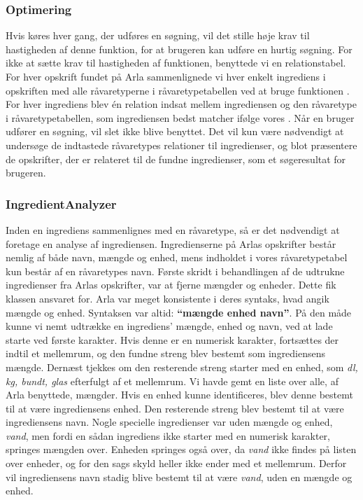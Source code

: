\subsubsection{Optimering}
Hvis  køres hver gang, der udføres en søgning, vil det stille høje krav til hastigheden af denne funktion, for at brugeren kan udføre en hurtig søgning. For ikke at sætte krav til hastigheden af funktionen, benyttede vi en relationstabel. For hver opskrift fundet på Arla sammenlignede vi hver enkelt ingrediens i opskriften med alle råvaretyperne i råvaretypetabellen ved at bruge funktionen . For hver ingrediens blev én relation indsat mellem ingrediensen og den råvaretype i råvaretypetabellen, som ingrediensen bedst matcher ifølge vores . Når en bruger udfører en søgning, vil  slet ikke blive benyttet. Det vil kun være nødvendigt at undersøge de indtastede råvaretypes relationer til ingredienser, og blot præsentere de opskrifter, der er relateret til de fundne ingredienser, som et søgeresultat for brugeren.

\subsubsection{IngredientAnalyzer}
Inden en ingrediens sammenlignes med en råvaretype, så er det nødvendigt at foretage en analyse af ingrediensen. Ingredienserne på Arlas opskrifter består nemlig af både navn, mængde og enhed, mens indholdet i vores råvaretypetabel kun består af en råvaretypes navn. Første skridt i behandlingen af de udtrukne ingredienser fra Arlas opskrifter, var at fjerne mængder og enheder. Dette fik klassen  ansvaret for. Arla var meget konsistente i deres syntaks, hvad angik mængde og enhed. Syntaksen var altid: \textbf{``mængde enhed navn''}.
På den måde kunne vi nemt udtrække en ingrediens' mængde, enhed og navn, ved at lade  starte ved første karakter. Hvis denne er en numerisk karakter, fortsættes der indtil et mellemrum, og den fundne streng blev bestemt som ingrediensens mængde. Dernæst tjekkes om den resterende streng starter med en enhed, som \fx \textit{dl, kg, bundt, glas} efterfulgt af et mellemrum. Vi havde gemt en liste over alle, af Arla benyttede, mængder. Hvis en enhed kunne identificeres, blev denne bestemt til at være ingrediensens enhed. Den resterende streng blev bestemt til at være ingrediensens navn.
Nogle specielle ingredienser var uden mængde og enhed, \fx \textit{vand}, men fordi en sådan ingrediens ikke starter med en numerisk karakter, springes mængden over. Enheden springes også over, da \textit{vand} ikke findes på listen over enheder, og for den sags skyld heller ikke ender med et mellemrum. Derfor vil ingrediensens navn stadig blive bestemt til at være \textit{vand}, uden en mængde og enhed.

